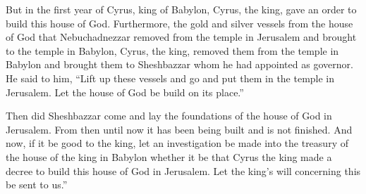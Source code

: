 \begin{inparaenum}
   But in the first year of Cyrus, king of Babylon, Cyrus, the king, gave an order to build this house of God.%
   Furthermore, the gold and silver vessels from the house of God that Nebuchadnezzar removed from the temple in Jerusalem and brought to the temple in Babylon, Cyrus, the king, removed them from the temple in Babylon and brought them to Sheshbazzar whom he had appointed as governor.%
   He said to him, ``Lift up these vessels and go and put them in the temple in Jerusalem. Let the house of God be build on its place.''%

   Then did Sheshbazzar come and lay the foundations of the house of God in Jerusalem. From then until now it has been being built and is not finished.%
   And now, if it be good to the king, let an investigation be made into the treasury of the house of the king in Babylon whether it be that Cyrus the king made a decree to build this house of God in Jerusalem. Let the king's will concerning this be sent to us.''%
\end{inparaenum}
